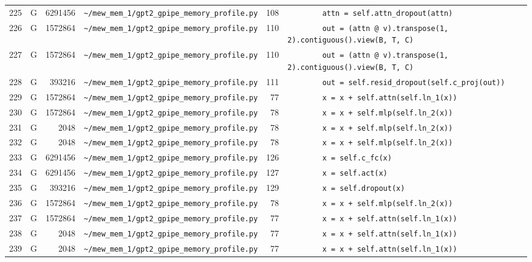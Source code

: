 \documentclass{article}
\begin{document}
\begin{longtable}{r l r p{6.5cm} r p{7.0cm}}
225 & G & 6291456 & \lstinline|~/mew_mem_1/gpt2_gpipe_memory_profile.py| & 108 & \lstinline|        attn = self.attn_dropout(attn)| \\
226 & G & 1572864 & \lstinline|~/mew_mem_1/gpt2_gpipe_memory_profile.py| & 110 & \lstinline|        out = (attn @ v).transpose(1, 2).contiguous().view(B, T, C)| \\
227 & G & 1572864 & \lstinline|~/mew_mem_1/gpt2_gpipe_memory_profile.py| & 110 & \lstinline|        out = (attn @ v).transpose(1, 2).contiguous().view(B, T, C)| \\
228 & G & 393216 & \lstinline|~/mew_mem_1/gpt2_gpipe_memory_profile.py| & 111 & \lstinline|        out = self.resid_dropout(self.c_proj(out))| \\
229 & G & 1572864 & \lstinline|~/mew_mem_1/gpt2_gpipe_memory_profile.py| & 77 & \lstinline|        x = x + self.attn(self.ln_1(x))| \\
230 & G & 1572864 & \lstinline|~/mew_mem_1/gpt2_gpipe_memory_profile.py| & 78 & \lstinline|        x = x + self.mlp(self.ln_2(x))| \\
231 & G & 2048 & \lstinline|~/mew_mem_1/gpt2_gpipe_memory_profile.py| & 78 & \lstinline|        x = x + self.mlp(self.ln_2(x))| \\
232 & G & 2048 & \lstinline|~/mew_mem_1/gpt2_gpipe_memory_profile.py| & 78 & \lstinline|        x = x + self.mlp(self.ln_2(x))| \\
233 & G & 6291456 & \lstinline|~/mew_mem_1/gpt2_gpipe_memory_profile.py| & 126 & \lstinline|        x = self.c_fc(x)| \\
234 & G & 6291456 & \lstinline|~/mew_mem_1/gpt2_gpipe_memory_profile.py| & 127 & \lstinline|        x = self.act(x)| \\
235 & G & 393216 & \lstinline|~/mew_mem_1/gpt2_gpipe_memory_profile.py| & 129 & \lstinline|        x = self.dropout(x)| \\
236 & G & 1572864 & \lstinline|~/mew_mem_1/gpt2_gpipe_memory_profile.py| & 78 & \lstinline|        x = x + self.mlp(self.ln_2(x))| \\
237 & G & 1572864 & \lstinline|~/mew_mem_1/gpt2_gpipe_memory_profile.py| & 77 & \lstinline|        x = x + self.attn(self.ln_1(x))| \\
238 & G & 2048 & \lstinline|~/mew_mem_1/gpt2_gpipe_memory_profile.py| & 77 & \lstinline|        x = x + self.attn(self.ln_1(x))| \\
239 & G & 2048 & \lstinline|~/mew_mem_1/gpt2_gpipe_memory_profile.py| & 77 & \lstinline|        x = x + self.attn(self.ln_1(x))| \\

\end{longtable}
\end{document}

